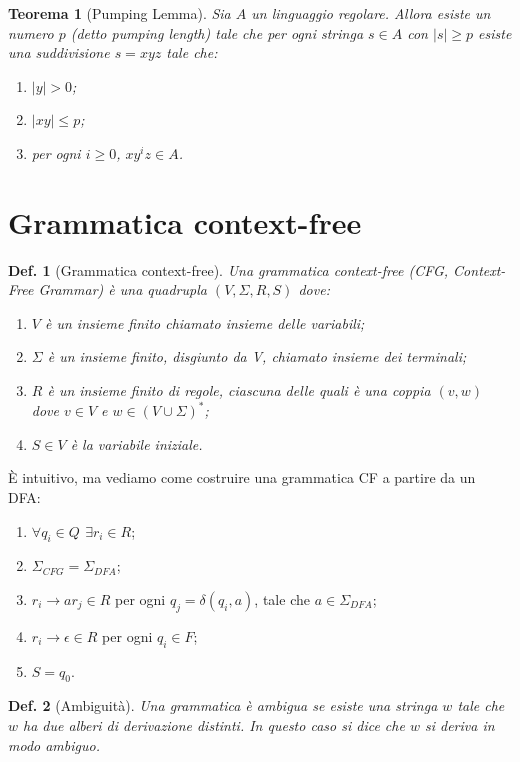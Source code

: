 \documentclass[11pt]{article}
\newtheorem{definition}{Def.}[section]
\newtheorem{theorem}{Teorema}[section]
\begin{document}
\begin{theorem}[Pumping Lemma]
	Sia $A$ un linguaggio regolare. Allora esiste un numero $p$ (detto pumping
	length) tale che per ogni stringa $s \in A$ con $|s| \geq p$ esiste una
	suddivisione $s = xyz$ tale che:
	\begin{enumerate}
		\item $|y| > 0$;
		\item $|xy| \leq p$;
		\item per ogni $i \geq 0$, $xy^iz \in A$.
	\end{enumerate}
\end{theorem}


\section{Grammatica context-free}

\begin{definition}[Grammatica context-free]
	Una grammatica context-free (CFG, Context-Free Grammar) è una quadrupla
	$(V, \Sigma, R, S)$ dove:
	\begin{enumerate}
		\item $V$ è un insieme finito chiamato insieme delle variabili;
		\item $\Sigma$ è un insieme finito, disgiunto da V, chiamato insieme dei
			terminali;
		\item $R$ è un insieme finito di regole, ciascuna delle quali è una
			coppia $(v, w)$ dove $v \in V$ e $w \in (V \cup \Sigma)^*$;
		\item $S \in V$ è la variabile iniziale.
	\end{enumerate}
\end{definition}

È intuitivo, ma vediamo come costruire una grammatica CF a partire da un DFA:
\begin{enumerate}
	\item $\forall q_i \in Q \, \ \exists r_i \in R$;
	\item $\Sigma_{CFG} = \Sigma_{DFA}$;
	\item $r_i \rightarrow ar_j \in R$ per ogni $q_j = \delta(q_i, a)$, tale che
		$a \in \Sigma_{DFA}$;
	\item $r_i \rightarrow \epsilon \in R$ per ogni $q_i \in F$;
	\item $S = q_0$.
\end{enumerate}

\begin{definition}[Ambiguità]
	Una grammatica è ambigua se esiste una stringa $w$ tale che $w$ ha due
	alberi di derivazione distinti. In questo caso si dice che $w$ si deriva in
	modo ambiguo.
\end{definition}
\end{document}

